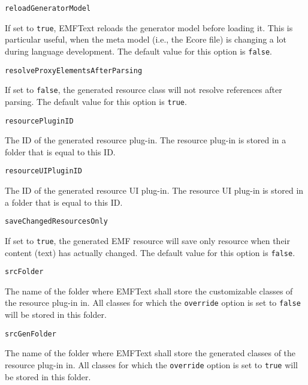 \noindent\texttt{reloadGeneratorModel}
\begin{myindentpar}{1cm}
If set to \texttt{true}, EMFText reloads the generator model before loading it. This is particular useful, when the meta model (i.e., the Ecore file) is changing a lot during language development. The default value for this option is \texttt{false}.
\end{myindentpar}

\noindent\texttt{resolveProxyElementsAfterParsing}
\begin{myindentpar}{1cm}
If set to \texttt{false}, the generated resource class will not resolve references after parsing. The default value for this option is \texttt{true}.
\end{myindentpar}

\noindent\texttt{resourcePluginID}
\begin{myindentpar}{1cm}
The ID of the generated resource plug-in. The resource plug-in is stored in a folder that is equal to this ID.
\end{myindentpar}

\noindent\texttt{resourceUIPluginID}
\begin{myindentpar}{1cm}
The ID of the generated resource UI plug-in. The resource UI plug-in is stored in a folder that is equal to this ID.
\end{myindentpar}

\noindent\texttt{saveChangedResourcesOnly}
\begin{myindentpar}{1cm}
If set to \texttt{true}, the generated EMF resource will save only resource when their content (text) has actually changed. The default value for this option is \texttt{false}.
\end{myindentpar}

\noindent\texttt{srcFolder}
\begin{myindentpar}{1cm}
The name of the folder where EMFText shall store the customizable classes of the resource plug-in in. All classes for which the \texttt{override} option is set to \texttt{false} will be stored in this folder.
\end{myindentpar}

\noindent\texttt{srcGenFolder}
\begin{myindentpar}{1cm}
The name of the folder where EMFText shall store the generated classes of the resource plug-in in. All classes for which the \texttt{override} option is set to \texttt{true} will be stored in this folder.
\end{myindentpar}

